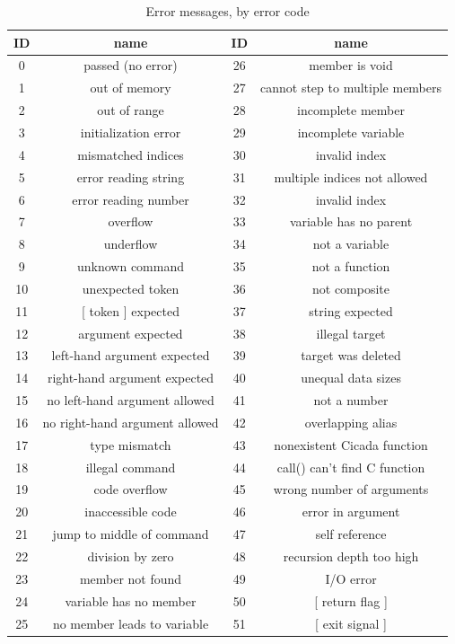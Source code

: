 \documentclass{article}
\begin{document}
\begin{table}
\begin{center}
\begin{tabular}{|c|c||c|c|}
\hline
{\bf ID} & {\bf name} & {\bf ID} & {\bf name}\\
\hline \hline
0 & passed (no error) & 26 & member is void\\
\cline{1-2}
1 & out of memory & 27 & cannot step to multiple members\\
\cline{1-2}
2 & out of range & 28 & incomplete member\\
3 & initialization error & 29 & incomplete variable\\
\cline{1-2}
4 & mismatched indices & 30 & invalid index\\
5 & error reading string & 31 & multiple indices not allowed\\
6 & error reading number & 32 & invalid index\\
7 & overflow & 33 & variable has no parent\\
 \cline{3-4}
 8 & underflow & 34 & not a variable\\
\cline{1-2}
9 & unknown command & 35 & not a function\\
10 & unexpected token & 36 & not composite\\
11 & [ token ] expected & 37 & string expected\\
\cline{1-2} \cline{3-4}
12 & argument expected & 38 & illegal target\\
13 & left-hand argument expected & 39 & target was deleted\\
\cline{3-4}
14 & right-hand argument expected & 40 & unequal data sizes\\
15 & no left-hand argument allowed & 41 & not a number\\
16 & no right-hand argument allowed & 42 & overlapping alias\\
\cline{1-2} \cline{3-4}
17 & type mismatch & 43 & nonexistent Cicada function\\
\cline{1-2}
18 & illegal command & 44 & call() can't find C function\\
19 & code overflow & 45 & wrong number of arguments\\
20 & inaccessible code & 46 & error in argument\\
\cline{3-4}
21 & jump to middle of command & 47 & self reference\\
\cline{1-2}
22 & division by zero & 48 & recursion depth too high\\
\cline{1-2}
23 & member not found & 49 & I/O error\\
\cline{3-4}
24 & variable has no member & 50 & [ return flag ]\\
25 & no member leads to variable & 51 & [ exit signal ]\\
\hline
\end{tabular}\\
\caption{Error messages, by error code}
\label{errCodeTable}
\end{center}
\end{table}
\end{document}

